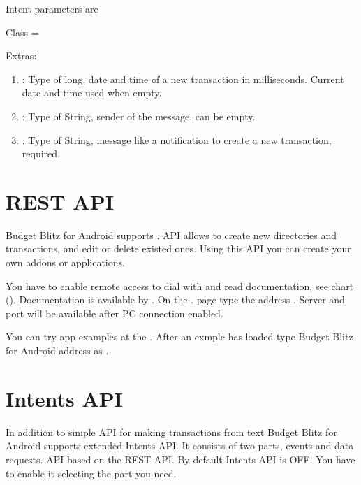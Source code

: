 \documentclass[a4paper,10pt,english]{sphinxmanual}
\begin{document}
Intent parameters are

Class = 

Extras:
\begin{enumerate}
\def\theenumi{\arabic{enumi}}
\def\labelenumi{\theenumi .}
\makeatletter\def\p@enumii{\p@enumi \theenumi .}\makeatother
\item {} 
: Type of long, date and time of a new transaction in milliseconds. Current date and time used when empty.

\item {} 
: Type of String, sender of the message, can be empty.

\item {} 
: Type of String, message like a notification to create a new transaction, required.

\end{enumerate}


\section{REST API}
\label{\detokenize{api:rest-api}}\label{\detokenize{api:sub-chapter-rest-api}}
Budget Blitz for Android supports . API allows to create new directories and transactions, and edit or delete existed ones. Using
this API you can create your own addons or applications.

You have to enable remote access to dial with  and read documentation, see chart {\hyperref[\detokenize{remote-access:chapter-remote-access}]{}} ().
Documentation is available by . On the . page type the address  .
Server and port will be available after PC connection enabled.

You can try app examples at the . After an exmple has loaded type Budget Blitz for Android address as .


\section{Intents API}
\label{\detokenize{api:intents-api}}
In addition to simple API for making transactions from text Budget Blitz for Android supports extended Intents API. It consists of two parts,
events and data requests. API based on the REST API. By default Intents API is OFF. You have to enable it
selecting the part you need.
\end{document}
